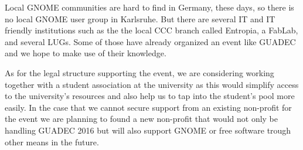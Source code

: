 Local GNOME communities are hard to find in Germany, these days,
so there is no local GNOME user group in Karlsruhe.
But there are several IT and IT friendly institutions such as the
the local CCC branch called Entropia, a FabLab, and several LUGs.
Some of those have already organized an event like GUADEC and
we hope to make use of their knowledge.

As for the legal structure supporting the event,
we are considering working together with a student association at the
university as this would simplify access to the university's resources
and also help us to tap into the student's pool more easily.
In the case that we cannot secure support from an existing non-profit for the
event we are planning to found a new non-profit that would not only be
handling GUADEC 2016 but will also support GNOME or free software trough
other means in the future.

